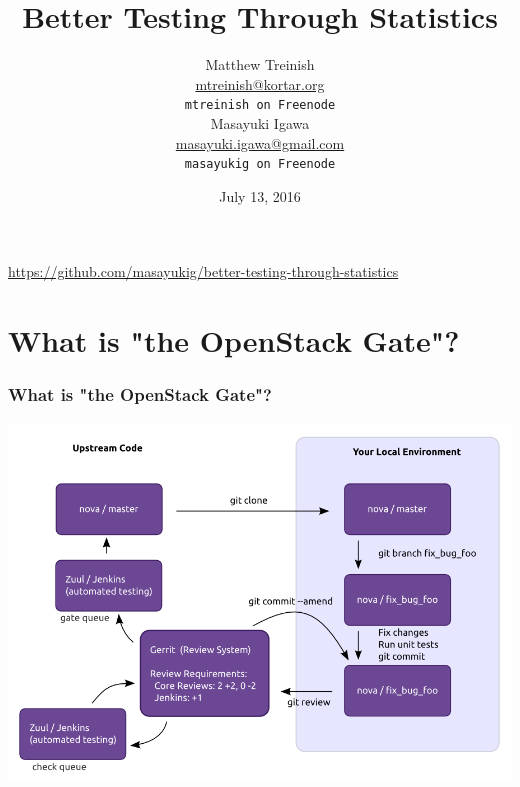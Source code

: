 \documentclass[aspectratio=169,11pt,hyperref={colorlinks=true}]{beamer}
\author[Matthew Treinish, Masayuki Igawa]{%
    \texorpdfstring{%
        \centering
        Matthew Treinish\\
        \href{mailto:mtreinish@kortar.org}{mtreinish@kortar.org}\\
        \texttt{mtreinish on Freenode}
   }
   {Matthew Treinish}\\
   \texorpdfstring{%
       \centering
       Masayuki Igawa\\
       \href{mailto:masayuki.igawa@gmail.com}{masayuki.igawa@gmail.com}\\
       \texttt{masayukig on Freenode}
  }
  {Masayuki Igawa}
}
\date{July 13, 2016}
\title[Better Testing Through Statistics
\hspace{2em}\insertframenumber/\inserttotalframenumber]{Better Testing Through Statistics}
\begin{document}
{%
\begin{frame}[noframenumbering]
    \hypersetup{colorlinks,urlcolor=white}
    \titlepage{}
    \centering
    \href{https://github.com/masayukig/better-testing-through-statistics}{https://github.com/masayukig/better-testing-through-statistics}
\end{frame}
}

\section{What is "the OpenStack Gate"?}
\begin{frame}
    \frametitle{What is "the OpenStack Gate"?}
	\begin{center}
		\includegraphics[width=.65\textwidth]{code_review.png}
	\end{center}
\end{frame}
\end{document}
